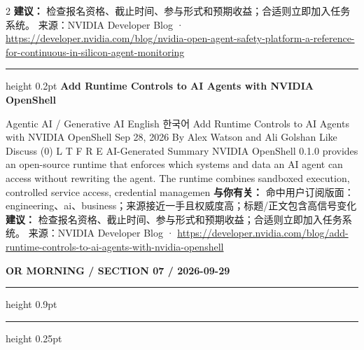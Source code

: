 \documentclass[10.5pt]{ctexart}
\begin{document}
\begin{multicols}{2}
\textbf{建议：} 检查报名资格、截止时间、参与形式和预期收益；合适则立即加入任务系统。
{\footnotesize\color{ormuted} 来源：NVIDIA Developer Blog · \url{https://developer.nvidia.com/blog/nvidia-open-agent-safety-platform-a-reference-for-continuous-in-silicon-agent-monitoring}}
\vspace{2mm}
\hrule height 0.2pt
\vspace{2mm}
{\large\bfseries Add Runtime Controls to AI Agents with NVIDIA OpenShell}\par
Agentic AI / Generative AI English 한국어 Add Runtime Controls to AI Agents with NVIDIA OpenShell Sep 28, 2026 By Alex Watson and Ali Golshan Like Discuss (0) L T F R E AI-Generated Summary NVIDIA OpenShell 0.1.0 provides an open-source runtime that enforces which systems and data an AI agent can access without rewriting the agent. The runtime combines sandboxed execution, controlled service access, credential managemen
\textbf{与你有关：} 命中用户订阅版面：engineering、ai、business；来源接近一手且权威度高；标题/正文包含高信号变化
\textbf{建议：} 检查报名资格、截止时间、参与形式和预期收益；合适则立即加入任务系统。
{\footnotesize\color{ormuted} 来源：NVIDIA Developer Blog · \url{https://developer.nvidia.com/blog/add-runtime-controls-to-ai-agents-with-nvidia-openshell}}
\end{multicols}
\newpage
{\small\bfseries OR MORNING / SECTION 07 / 2026-09-29}
\vspace{2mm}
\hrule height 0.9pt
\vspace{1.5mm}
\hrule height 0.25pt
\vspace{4mm}
\end{document}
